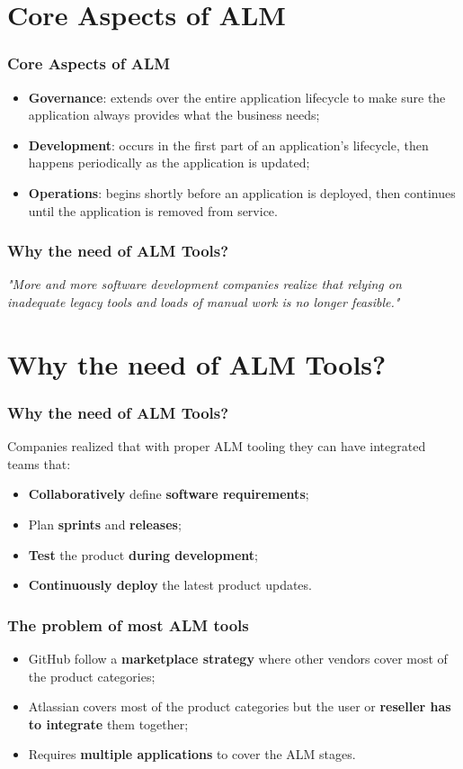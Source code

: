 \documentclass[notes]{beamer}
\begin{document}
\section{Core Aspects of ALM}

\begin{frame}
  \frametitle{Core Aspects of ALM}
  \begin{itemize}[<+->]
  \item \textbf{Governance}: extends over the entire application lifecycle to make sure the application always provides what the business needs;
  \item \textbf{Development}: occurs in the first part of an application’s lifecycle, then happens periodically as
the application is updated;
  \item \textbf{Operations}: begins shortly before an application is deployed, then continues until the application is removed from service.
  \end{itemize}
\end{frame}

\begin{frame}
  \frametitle{Why the need of ALM Tools?}
  \centering
  \textit{"More and more software development companies realize that relying on inadequate legacy tools and loads of manual work is no longer feasible."}
\end{frame}

\section{Why the need of ALM Tools?}

\begin{frame}
  \frametitle{Why the need of ALM Tools?}
  Companies realized that with proper ALM tooling they can have integrated teams that: \\
  \begin{itemize}[<+->]
  \item \textbf{Collaboratively} define \textbf{software requirements};
  \item Plan \textbf{sprints} and \textbf{releases};
  \item \textbf{Test} the product \textbf{during development};
  \item \textbf{Continuously deploy} the latest product updates.
  \end{itemize}
\end{frame}

\begin{frame}
  \frametitle{The problem of most ALM tools}
  \begin{itemize}[<+->]
  \item GitHub follow a \textbf{marketplace strategy} where other vendors cover most of the product categories;
  \item Atlassian covers most of the product categories but the user or \textbf{reseller has to integrate} them together;
  \item Requires \textbf{multiple applications} to cover the ALM stages.
  \end{itemize}
\end{frame}
\end{document}
